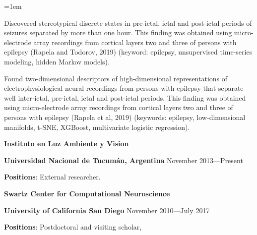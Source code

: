 \documentclass{article}
\begin{document}
\begin{list}{}{\leftmargin=1em}

\item Discovered stereotypical discrete states in pre-ictal, ictal and
post-ictal periods of seizures separated by more than one hour. This finding
was obtained using micro-electrode array recordings from cortical layers two
and three of persons with epilepsy (Rapela and Todorov, 2019) (keyword:
epilepsy, unsupervised time-series modeling, hidden Markov models).

\item Found two-dimensional descriptors of high-dimensional representations of
electrophysiological neural recordings from persons with epilepsy that
separate well inter-ictal, pre-ictal, ictal and post-ictal periods.
%
This finding was obtained using micro-electrode array recordings from cortical
layers two and three of persons with epilepsy (Rapela et al, 2019)
(keywords: epilepsy, low-dimensional manifolds, t-SNE, XGBoost, multivariate
logistic regression).

\end{list}

\par
\vspace{2\baselineskip}
{\bf Instituto en Luz Ambiente y Vision}
\par
{\bf Universidad Nacional de Tucum\'{a}n, Argentina} \hspace*{\fill} November 2013---Present
\par
{\bf Positions}: External researcher.
\par

\par
\vspace{2\baselineskip}
{\bf Swartz Center for Computational Neuroscience}
\par
{\bf University of California San Diego} \hspace*{\fill} November 2010---July 2017
\par
{\bf Positions}: Postdoctoral and visiting scholar,
\par
\end{document}
